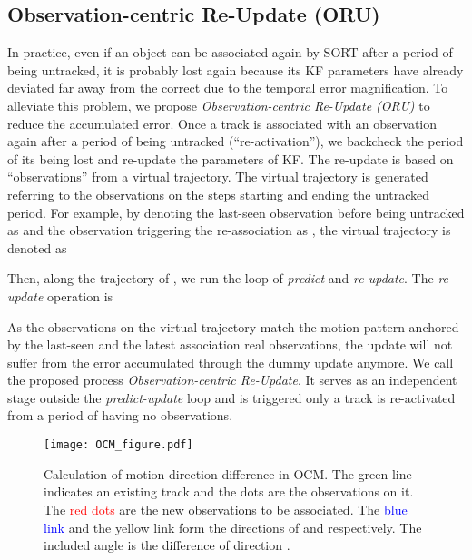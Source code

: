\documentclass[10pt,twocolumn,letterpaper]{article}
\begin{document}
\subsection{Observation-centric Re-Update (ORU)} 
In practice, even if an object can be associated again by SORT after a period of being untracked, it is probably lost again because its KF parameters have already deviated far away from the correct due to the temporal error magnification. 
To alleviate this problem, we propose \textit{Observation-centric Re-Update (ORU)} to reduce the accumulated error. 
Once a track is associated with an observation again after a period of being untracked (``re-activation''), we backcheck the period of its being lost and re-update the parameters of KF.
The re-update is based on ``observations'' from a virtual trajectory. The virtual trajectory is generated referring to the observations on the steps starting and ending the untracked period.
For example, by denoting the last-seen observation before being untracked as  and the observation triggering the re-association as , the virtual trajectory is denoted as 


Then, along the trajectory of , we run the loop of \textit{predict} and \textit{re-update}. The \textit{re-update} operation is 


As the observations on the virtual trajectory match the motion pattern anchored by the last-seen and the latest association real observations, the update will not suffer from the error accumulated through the dummy update anymore.
We call the proposed process \textit{Observation-centric Re-Update}. It serves as an independent stage outside the \textit{predict-update} loop and is triggered only a track is re-activated from a period of having no observations.

\begin{figure}
    \centering
    \texttt{[image: OCM\_figure.pdf]}
    \caption{Calculation of motion direction difference in OCM. The \textcolor{cadmiumgreen}{green line} indicates an existing track and the \textcolor{cadmiumgreen}{dots} are the observations on it. The \textcolor{red}{red dots} are the new observations to be associated. The \textcolor{blue}{blue link} and the \textcolor{cadmiumorange}{yellow link} form the directions of  and  respectively. The included angle is the difference of direction .}
    \label{fig:ocm}
    \vspace{-0.5cm}
\end{figure}
\end{document}
